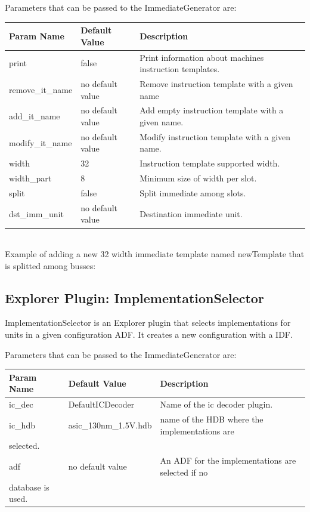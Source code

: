 \documentclass[a4paper,twoside]{tceusermanual}
\begin{document}
Parameters that can be passed to the ImmediateGenerator are:

\begin{tabular}{p{}p{}
                p{}}
\textbf{Param Name} &\textbf{Default Value} &\textbf{Description} \\
\hline
print & false & Print information about machines instruction templates.\\
remove\_it\_name & no default value & Remove instruction template with a
given name \\
add\_it\_name & no default value & Add empty instruction template with a
given name. \\
modify\_it\_name & no default value & Modify instruction template with a
given name. \\
width & 32 & Instruction template supported width.\\
width\_part & 8 & Minimum size of width per slot.\\
split & false & Split immediate among slots.\\
dst\_imm\_unit & no default value & Destination immediate unit.\\
\end{tabular}\\

Example of adding a new 32 width immediate template named newTemplate that is
splitted among busses:


\subsection{Explorer Plugin: ImplementationSelector}
ImplementationSelector is an Explorer plugin that selects implementations for
units in a given configuration ADF. It creates a new configuration with a IDF.

Parameters that can be passed to the ImmediateGenerator are:

\begin{tabular}{p{}p{}
                p{}}
\textbf{Param Name} &\textbf{Default Value} &\textbf{Description} \\
\hline
ic\_dec & DefaultICDecoder & Name of the ic decoder plugin. \\
ic\_hdb & asic\_130nm\_1.5V.hdb & name of the HDB where the implementations are \\
selected. \\
adf & no default value & An ADF for the implementations are selected if no \\
database is used. \\
\end{tabular}\\
\end{document}
